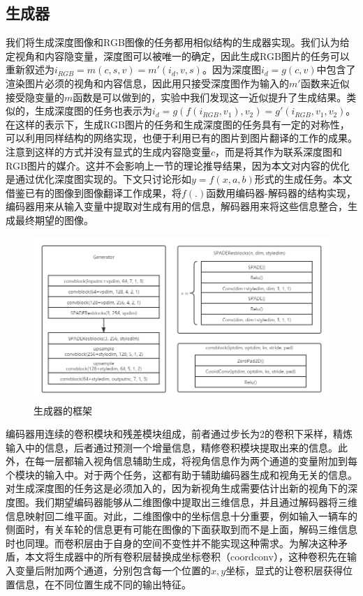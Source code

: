\documentclass[UTF8,openany,AutoFakeBold,AutoFakeSlant,cs4size]{ctexbook}
\begin{document}
\subsection{生成器}

我们将生成深度图像和RGB图像的任务都用相似结构的生成器实现。我们认为给定视角和内容隐变量，深度图可以被唯一的确定，因此生成RGB图片的任务可以重新叙述为$i_{RGB} = m(c, s, v) = m'(i_d, v, s)$。因为深度图$i_d = g(c, v)$中包含了渲染图片必须的视角和内容信息，因此用只接受深度图作为输入的$m'$函数来近似接受隐变量的$m$函数是可以做到的，实验中我们发现这一近似提升了生成结果。类似的，生成深度图的任务也表示为$i_{d} = g(f(i_{RGB}, v_1), v_2) = g'(i_{RGB}, v_1, v_2)$。在这样的表示下，生成RGB图片的任务和生成深度图的任务具有一定的对称性，可以利用同样结构的网络实现，也便于利用已有的图片到图片翻译的工作的成果。注意到这样的方式并没有显式的生成内容隐变量$c$，而是将其作为联系深度图和RGB图片的媒介。这并不会影响上一节的理论推导结果，因为本文对内容的优化是通过优化深度图实现的。下文只讨论形如$y = f(x, a, b)$形式的生成任务。本文借鉴已有的图像到图像翻译工作成果，将$f(.)$函数用编码器-解码器的结构实现，编码器用来从输入变量中提取对生成有用的信息，解码器用来将这些信息整合，生成最终期望的图像。

\begin{figure}
\centering
\includegraphics[width=15cm]{./images/generator.png}
\caption{生成器的框架}
\label{model_generator}
\end{figure}


编码器用连续的卷积模块和残差模块组成，前者通过步长为2的卷积下采样，精炼输入中的信息，后者通过预测一个增量信息，精修卷积模块提取出来的信息。此外，在每一层都输入视角信息辅助生成，将视角信息作为两个通道的变量附加到每个模块的输入中。对于两个任务，这都有助于辅助编码器生成和视角无关的信息。对生成深度图的任务这是必须加入的，因为新视角生成需要估计出新的视角下的深度图。我们期望编码器能够从二维图像中提取出三维信息，并且通过解码器将三维信息映射回二维平面。对此，二维图像中的坐标信息十分重要，例如输入一辆车的侧面时，有关车轮的信息更有可能在图像的下面获取到而不是上面，解码三维信息时也同理。而卷积层由于自身的空间不变性并不能实现这种需求。为解决这种矛盾，本文将生成器中的所有卷积层替换成坐标卷积（coordconv），这种卷积先在输入变量后附加两个通道，分别包含每一个位置的$x,y$坐标，显式的让卷积层获得位置信息，在不同位置生成不同的输出特征。
\end{document}
